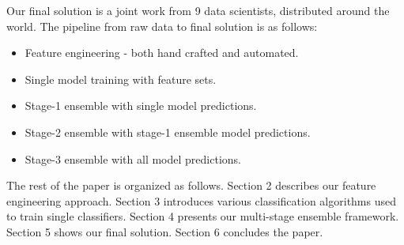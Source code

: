 Our final solution is a joint work from 9 data scientists, distributed around the world.
The pipeline from raw data to final solution is as follows:
\begin{itemize}
  \setlength\itemsep{0em}
  \item Feature engineering - both hand crafted and automated.
  \item Single model training with feature sets.
  \item Stage-1 ensemble with single model predictions.
  \item Stage-2 ensemble with stage-1 ensemble model predictions.
  \item Stage-3 ensemble with all model predictions.
\end{itemize}

The rest of the paper is organized as follows. Section 2 describes our feature engineering approach. Section 3 introduces various classification algorithms used to train single classifiers. Section 4 presents our multi-stage ensemble framework. Section 5 shows our final solution. Section 6 concludes the paper.

